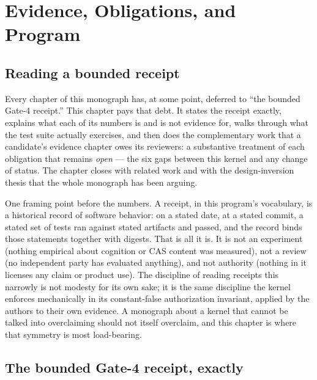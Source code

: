 \chapter{Evidence, Obligations, and Program}\label{evid:chapter}

\section{Reading a bounded receipt}\label{evid:reading}

Every chapter of this monograph has, at some point, deferred to ``the bounded Gate-4 receipt.'' This chapter pays that debt. It states the receipt exactly, explains what each of its numbers is and is not evidence for, walks through what the test suite actually exercises, and then does the complementary work that a candidate's evidence chapter owes its reviewers: a substantive treatment of each obligation that remains \emph{open} --- the six gaps between this kernel and any change of status. The chapter closes with related work and with the design-inversion thesis that the whole monograph has been arguing.

One framing point before the numbers. A receipt, in this program's vocabulary, is a historical record of software behavior: on a stated date, at a stated commit, a stated set of tests ran against stated artifacts and passed, and the record binds those statements together with digests. That is all it is. It is not an experiment (nothing empirical about cognition or CAS content was measured), not a review (no independent party has evaluated anything), and not authority (nothing in it licenses any claim or product use). The discipline of reading receipts this narrowly is not modesty for its own sake; it is the same discipline the kernel enforces mechanically in its constant-false authorization invariant, applied by the authors to their own evidence. A monograph about a kernel that cannot be talked into overclaiming should not itself overclaim, and this chapter is where that symmetry is most load-bearing.

\section{The bounded Gate-4 receipt, exactly}\label{evid:receipt}

